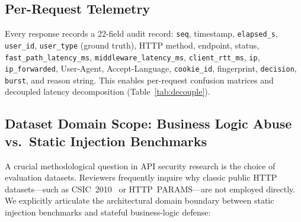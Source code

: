 \documentclass[journal,10pt]{IEEEtran}
\begin{document}
\subsection{Per-Request Telemetry}
Every response records a 22-field audit record: \texttt{seq}, timestamp, \texttt{elapsed\_s}, \texttt{user\_id}, \texttt{user\_type} (ground truth), HTTP method, endpoint, status, \texttt{fast\_path\_latency\_ms}, \texttt{middleware\_latency\_ms}, \texttt{client\_rtt\_ms}, \texttt{ip}, \texttt{ip\_forwarded}, User-Agent, Accept-Language, \texttt{cookie\_id}, fingerprint, \texttt{decision}, \texttt{burst}, and reason string. This enables per-request confusion matrices and decoupled latency decomposition (Table~\ref{tab:decouple}).

\subsection{Dataset Domain Scope: Business Logic Abuse vs.\ Static Injection Benchmarks}
\label{sec:dataset-scope}
A crucial methodological question in API security research is the choice of evaluation datasets. Reviewers frequently inquire why classic public HTTP datasets---such as CSIC~2010~\cite{csic2010} or HTTP~PARAMS---are not employed directly. We explicitly articulate the architectural domain boundary between static injection benchmarks and stateful business-logic defense:
\end{document}
